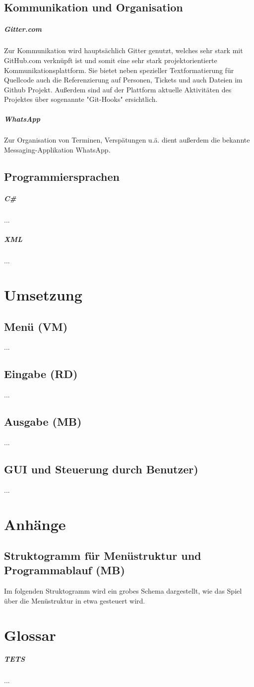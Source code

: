 \documentclass[11pt]{scrreprt}
\begin{document}
\section{Kommunikation und Organisation}
\paragraph{Gitter.com}
Zur Kommunikation wird haupts\"achlich Gitter genutzt, welches sehr stark mit GitHub.com verkn\"upft ist und somit eine sehr stark projektorientierte Kommunikationsplattform. Sie bietet neben spezieller Textformatierung f\"ur Quellcode auch die Referenzierung auf Personen, Tickets und auch Dateien im Github Projekt. Außerdem sind auf der Plattform aktuelle Aktivit\"aten des Projektes \"uber sogenannte "Git-Hooks" ersichtlich.
\paragraph{WhatsApp}
Zur Organisation von Terminen, Versp\"atungen u.ä. dient außerdem die bekannte Messaging-Applikation WhatsApp.


\section{Programmiersprachen}
\paragraph{C\#}
...
\paragraph{XML}
...
\newpage
\chapter{Umsetzung}
\section{Menü (VM)}
...
\section{Eingabe (RD)}
...
\section{Ausgabe (MB)}
...
\section{GUI und Steuerung durch Benutzer)}
...
\newpage
\chapter{Anhänge}
\section{Struktogramm für Menüstruktur und Programmablauf (MB)}
Im folgenden Struktogramm wird ein grobes Schema dargestellt, wie das Spiel über die Menüstruktur in etwa gesteuert wird.

\newpage
\chapter{Glossar}
\paragraph{TETS} ...
\end{document}

